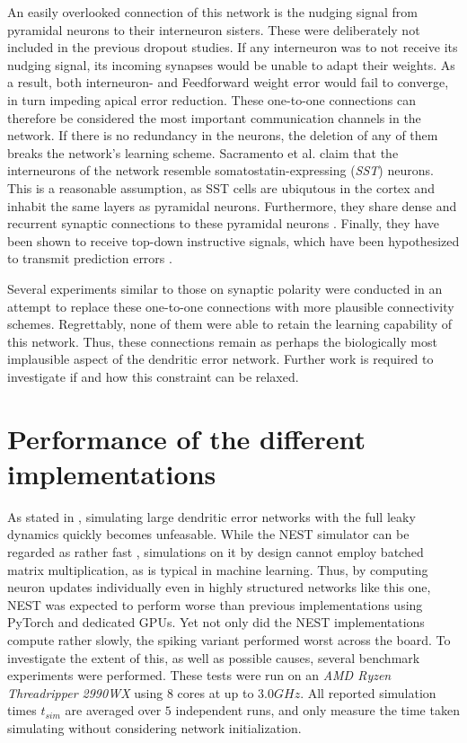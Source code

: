 An easily overlooked connection of this network is the nudging signal from pyramidal neurons to their interneuron
sisters. These were deliberately not included in the previous dropout studies. If any interneuron was to not receive its
nudging signal, its incoming synapses would be unable to adapt their weights. As a result, both interneuron- and
Feedforward weight error would fail to converge, in turn impeding apical error reduction. These one-to-one connections
can  therefore be considered the most important communication channels in the network. If there is no redundancy in the
neurons, the deletion of any of them breaks the network's learning scheme. Sacramento et al. claim that the interneurons
of the network resemble somatostatin-expressing (\textit{SST}) neurons. This is a reasonable assumption, as SST cells
are ubiqutous in the cortex and inhabit the same layers as pyramidal neurons. Furthermore, they share dense and
recurrent synaptic connections to these pyramidal neurons \citep{urban2016somatostatin}. Finally, they have been shown
to receive top-down instructive signals, which have been hypothesized to transmit prediction errors
\citep{Leinweber2017}. 

Several experiments similar to those on synaptic polarity were conducted in an attempt to replace these one-to-one
connections with more plausible connectivity schemes. Regrettably, none of them were able to retain the learning
capability of this network. Thus, these connections remain as perhaps the biologically most implausible aspect of the
dendritic error network. Further work is required to investigate if and how this constraint can be relaxed.



\section{Performance of the different implementations}\label{sec-benchmark}

As stated in \cite{Haider2021}, simulating large dendritic error networks with the full leaky dynamics quickly becomes
unfeasable. While the NEST simulator can be regarded as rather fast \citep{albada2018performance}, simulations on it by
design cannot employ batched matrix multiplication, as is typical in machine learning. Thus, by computing neuron updates
individually even in highly structured networks like this one, NEST was expected to perform worse than previous
implementations using PyTorch and dedicated GPUs. Yet not only did the NEST implementations compute rather slowly, the
spiking variant performed worst across the board. To investigate the extent of this, as well as possible causes, several
benchmark experiments were performed. These tests were run on an \textit{AMD Ryzen Threadripper 2990WX} using 8 cores at
up to $3.0GHz$. All reported simulation times $t_{sim}$ are averaged over $5$ independent runs, and only measure the
time taken simulating without considering network initialization. \newline



